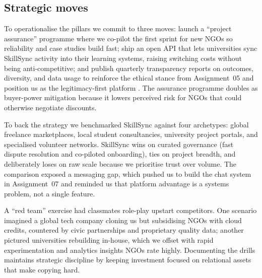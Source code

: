 \subsection*{Strategic moves}
To operationalise the pillars we commit to three moves: launch a ``project assurance'' programme where we co-pilot the first sprint for new NGOs so reliability and case studies build fast; ship an open API that lets universities sync SkillSync activity into their learning systems, raising switching costs without being anti-competitive; and publish quarterly transparency reports on outcomes, diversity, and data usage to reinforce the ethical stance from Assignment~05 and position us as the legitimacy-first platform \citep{Srnicek2017,Zuboff2019}. The assurance programme doubles as buyer-power mitigation because it lowers perceived risk for NGOs that could otherwise negotiate discounts.

To back the strategy we benchmarked SkillSync against four archetypes: global freelance marketplaces, local student consultancies, university project portals, and specialised volunteer networks. SkillSync wins on curated governance (fast dispute resolution and co-piloted onboarding), ties on project breadth, and deliberately loses on raw scale because we prioritise trust over volume. The comparison exposed a messaging gap, which pushed us to build the chat system in Assignment~07 and reminded us that platform advantage is a systems problem, not a single feature.

A ``red team'' exercise had classmates role-play upstart competitors. One scenario imagined a global tech company cloning us but subsidising NGOs with cloud credits, countered by civic partnerships and proprietary quality data; another pictured universities rebuilding in-house, which we offset with rapid experimentation and analytics insights NGOs rate highly. Documenting the drills maintains strategic discipline by keeping investment focused on relational assets that make copying hard.

